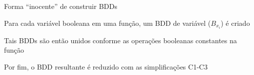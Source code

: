 \expandafter\documentclass\expandafter[table, usenames, svgnames, dvipsnames,14pt, \classopts]{beamer}
\begin{document}
\begin{frame}{Forma ``inocente'' de construir \uppercase{BDD}s}

    \begin{outline}[enumerate]
        \1 Para cada variável booleana em uma função, um BDD de variável ($B_{x_i}$) é criado
        
        \vspace{1em}
        
        \1 Tais BDDs são então unidos conforme as operações booleanas constantes na função
        
        \vspace{1em}
        
        \1 Por fim, o BDD resultante é reduzido com as simplificações C1-C3
    \end{outline}

\end{frame}
\end{document}

